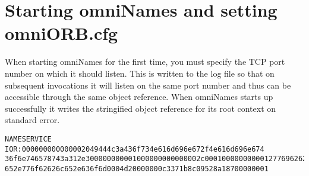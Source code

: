 \documentclass[11pt,twoside,onecolumn]{article}
\begin{document}
\section{Starting omniNames and setting omniORB.cfg}

When starting omniNames for the first time, you must specify the TCP port
number on which it should listen.  This is written to the log file so that on
subsequent invocations it will listen on the same port number and thus can be
accessible through the same object reference.  When omniNames starts up
successfully it writes the stringified object reference for its root context on
standard error.


{\small
\begin{verbatim}
NAMESERVICE IOR:000000000000002049444c3a436f734e616d696e672f4e616d696e674
36f6e746578743a312e300000000001000000000000002c0001000000000012776962626c
652e776f62626c652e636f6d0004d20000000c3371b8c09528a18700000001
\end{verbatim}
}
\end{document}
